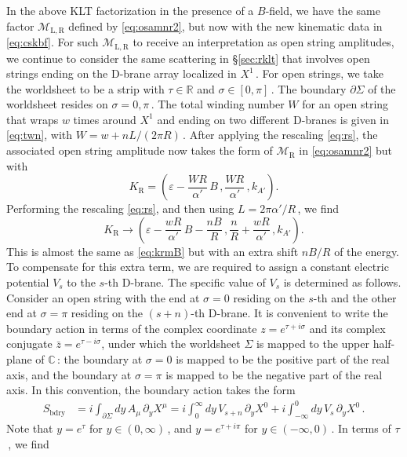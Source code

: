 \documentclass[11pt]{article}
\newcommand{\be}{\begin{equation}}
\newcommand{\ee}{\end{equation}}
\newcommand{\CM}{\mathcal{M}}
\newcommand{\lr}{\left (}
\newcommand{\rr}{\right )}
\newcommand{\p}{\partial}
\begin{document}
In the above KLT factorization in the presence of a $B$-field, we have the same factor $\CM_{\text{L},\,\text{R}}$ defined by \eqref{eq:osamnr2}, but now with the new kinematic data in \eqref{eq:cskbf}. For such $\CM_{\text{L},\,\text{R}}$ to receive an interpretation as open string amplitudes, we continue to consider the same scattering in \S\ref{sec:rklt} that involves open strings ending on the D-brane array localized in $X^1$\,. For open strings, we take the worldsheet to be a strip with $\tau \in \mathbb{R}$ and $\sigma \in [0, \pi]$\,. The boundary $\p\Sigma$ of the worldsheet resides on $\sigma = 0, \pi$\,. The total winding number $W$ for an open string that wraps $w$ times around $X^1$ and ending on two different D-branes is given in \eqref{eq:twn}, with $W = w + n L / (2\pi R)$\,. After applying the rescaling \eqref{eq:rs}, the associated open string amplitude now takes the form of $\CM_{\text{R}}$ in \eqref{eq:osamnr2} but with 
%
\be \label{eq:krosb}
    K_{\text{R}} = \lr \varepsilon - \frac{W R}{\alpha'} \, B\,, \frac{WR}{\alpha'}\,, k_{A'} \rr.
\ee
%
Performing the rescaling \eqref{eq:rs}, and then using $L = 2 \pi \alpha' / R$\,, we find
%
\be \label{eq:krreb}
    K_\text{R} \rightarrow \lr \varepsilon - \frac{w R}{\alpha'} \, B -  \frac{n B}{R}\,, \frac{n}{R} + \frac{w R}{\alpha'}\,, k_{A'} \rr.
\ee
%
This is almost the same as \eqref{eq:krmB} but with an extra shift $n B / R$ of the energy. To compensate for this extra term, we are required to assign a constant electric potential $V_s$ to the $s$-th D-brane. The specific value of $V_s$ is determined as follows.
%
Consider an open string with the end at $\sigma = 0$ residing on the $s$-th and the other end at $\sigma = \pi$ residing on the $(s+n)$-th D-brane. It is convenient to write the boundary action in terms of the complex coordinate $z = e^{\tau + i \sigma}$ and its complex conjugate $\bar{z} = e^{\tau - i \sigma}$,
%
under which the worldsheet $\Sigma$ is mapped to the upper half-plane of $\mathbb{C}$\,: the boundary at $\sigma = 0$ is mapped to be the positive part of the real axis, and the boundary at $\sigma = \pi$ is mapped to be the negative part of the real axis. In this convention, the boundary action takes the form
%
\begin{align} \label{eq:bdrya}
    S_\text{bdry} & = i \int_{\p\Sigma} dy \, A_\mu \, \p_y X^\mu
    = i \int_0^\infty dy \, V_{s+n} \, \p_y X^0 + i \int_{-\infty}^0 dy \, V_{s} \, \p_y X^0\,.
\end{align}
%
Note that $y = e^\tau$ for $y \in (0, \infty)$\,, and $y = e^{\tau + i \pi}$ for $y \in (-\infty,0)$\,. In terms of $\tau$\,, we find
\end{document}
